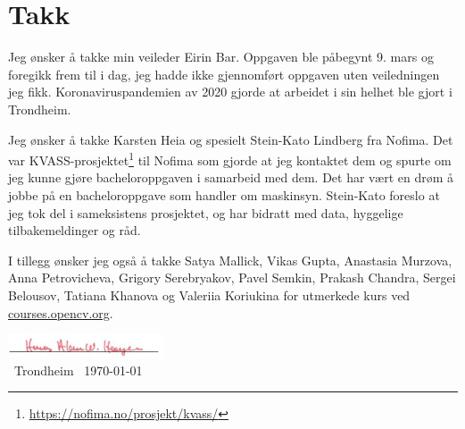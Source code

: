 \section*{Takk}

Jeg ønsker å takke min veileder Eirin Bar. Oppgaven ble påbegynt 9. mars og foregikk frem til i dag, jeg hadde ikke gjennomført oppgaven uten veiledningen jeg fikk. Koronaviruspandemien av 2020 gjorde at arbeidet i sin helhet ble gjort i Trondheim.

Jeg ønsker å takke Karsten Heia og spesielt Stein-Kato Lindberg fra Nofima. Det var KVASS-prosjektet\footnote{\url{https://nofima.no/prosjekt/kvass/}} til Nofima som gjorde at jeg kontaktet dem og spurte om jeg kunne gjøre bacheloroppgaven i samarbeid med dem. Det har vært en drøm å jobbe på en bacheloroppgave som handler om maskinsyn. Stein-Kato foreslo at jeg tok del i sameksistens prosjektet, og har bidratt med data, hyggelige tilbakemeldinger og råd.

I tillegg ønsker jeg også å takke Satya Mallick, Vikas Gupta, Anastasia Murzova, Anna Petrovicheva, Grigory Serebryakov, Pavel Semkin, Prakash Chandra, Sergei Belousov, Tatiana Khanova og Valeriia Koriukina for utmerkede kurs ved \url{courses.opencv.org}.

\begin{flushright} 
\includegraphics{figures/underskrift}\\ \ Trondheim \ \today
\end{flushright} 


